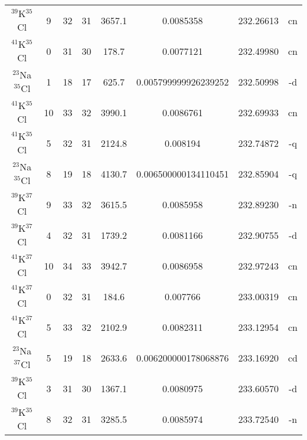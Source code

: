 \begin{table*}[htp]
\begin{tabular}{cccccccc}
$^{39}$K$^{35}$Cl & 9 & 32 & 31 & 3657.1 & 0.0085358 & 232.26613 & cn \\
$^{41}$K$^{35}$Cl & 0 & 31 & 30 & 178.7 & 0.0077121 & 232.49980 & cn \\
$^{23}$Na$^{35}$Cl & 1 & 18 & 17 & 625.7 & 0.005799999926239252 & 232.50998 & -d \\
$^{41}$K$^{35}$Cl & 10 & 33 & 32 & 3990.1 & 0.0086761 & 232.69933 & cn \\
$^{41}$K$^{35}$Cl & 5 & 32 & 31 & 2124.8 & 0.008194 & 232.74872 & -q \\
$^{23}$Na$^{35}$Cl & 8 & 19 & 18 & 4130.7 & 0.006500000134110451 & 232.85904 & -q \\
$^{39}$K$^{37}$Cl & 9 & 33 & 32 & 3615.5 & 0.0085958 & 232.89230 & -n \\
$^{39}$K$^{37}$Cl & 4 & 32 & 31 & 1739.2 & 0.0081166 & 232.90755 & -d \\
$^{41}$K$^{37}$Cl & 10 & 34 & 33 & 3942.7 & 0.0086958 & 232.97243 & cn \\
$^{41}$K$^{37}$Cl & 0 & 32 & 31 & 184.6 & 0.007766 & 233.00319 & cn \\
$^{41}$K$^{37}$Cl & 5 & 33 & 32 & 2102.9 & 0.0082311 & 233.12954 & cn \\
$^{23}$Na$^{37}$Cl & 5 & 19 & 18 & 2633.6 & 0.006200000178068876 & 233.16920 & cd \\
$^{39}$K$^{35}$Cl & 3 & 31 & 30 & 1367.1 & 0.0080975 & 233.60570 & -d \\
$^{39}$K$^{35}$Cl & 8 & 32 & 31 & 3285.5 & 0.0085974 & 233.72540 & -n \\
\hline
\end{tabular}

\par 
\end{table*}
